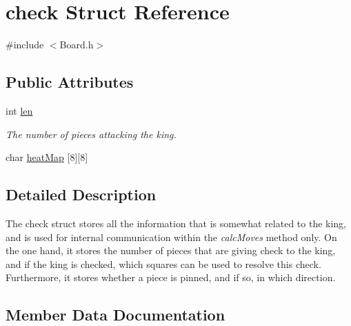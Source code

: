 \hypertarget{structcheck}{}\section{check Struct Reference}
\label{structcheck}


{\ttfamily \#include $<$Board.\+h$>$}

\subsection*{Public Attributes}
\begin{DoxyCompactItemize}
\item 
int \hyperlink{structcheck_a004e9a83f3635e9ec1e40c98d3ba0519}{len}\hypertarget{structcheck_a004e9a83f3635e9ec1e40c98d3ba0519}{}\label{structcheck_a004e9a83f3635e9ec1e40c98d3ba0519}

\begin{DoxyCompactList}\small\item\em The number of pieces attacking the king. \end{DoxyCompactList}\item 
char \hyperlink{structcheck_a20edc7f43122fbfd399629ed8b41dc6a}{heat\+Map} \mbox{[}8\mbox{]}\mbox{[}8\mbox{]}
\end{DoxyCompactItemize}


\subsection{Detailed Description}
The check struct stores all the information that is somewhat related to the king, and is used for internal communication within the {\itshape calc\+Moves} method only. On the one hand, it stores the number of pieces that are giving check to the king, and if the king is checked, which squares can be used to resolve this check. Furthermore, it stores whether a piece is pinned, and if so, in which direction. 

\subsection{Member Data Documentation}
